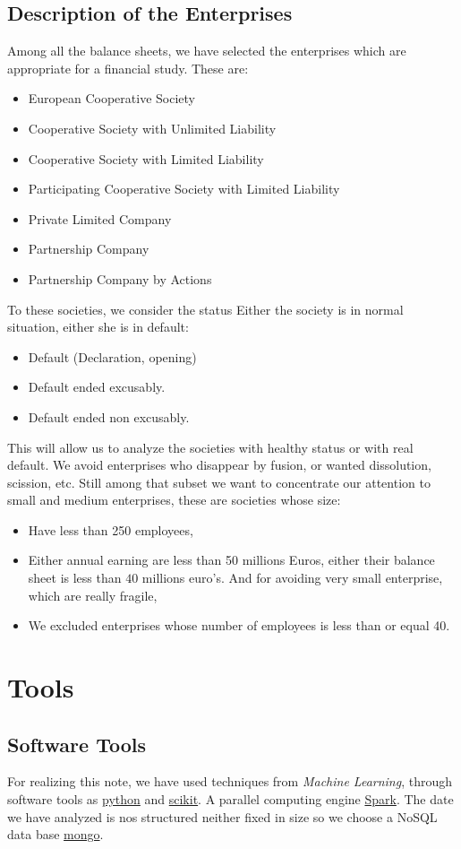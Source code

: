 \documentclass[DIV=calc, paper=a4, fontsize=11pt, twocolumn]{scrartcl}
\begin{document}
\subsection{Description of the Enterprises}
Among all the balance sheets, we have selected the enterprises which are appropriate for a financial study. These are:
\begin{itemize}
    \item European Cooperative Society
    \item Cooperative Society with Unlimited Liability
    \item Cooperative Society with Limited Liability
    \item Participating Cooperative Society with Limited Liability
    \item Private Limited Company
    \item Partnership Company
    \item Partnership Company by Actions
\end{itemize}
To these societies, we consider the status Either the society is in normal situation, either she is in default:
\begin{itemize}
    \item Default (Declaration, opening)
    \item Default ended excusably.
    \item Default ended non excusably.
\end{itemize}
This will allow us to analyze the societies with healthy status or with real default. We avoid enterprises who disappear by fusion, or
wanted dissolution, scission, etc.
Still among that subset we want to concentrate our attention to small and medium enterprises, these are societies whose size:
\begin{itemize}
    \item Have less than 250 employees,
    \item Either annual earning are less than 50 millions Euros, either their balance sheet is less than $40$ millions euro's. And for avoiding very small enterprise, which are really fragile,
    \item We excluded enterprises whose number of employees is less than or equal 40.
\end{itemize}

\section{Tools}
\subsection{Software Tools}
For realizing this note, we have used techniques from \emph{Machine Learning}, through software tools as \href{https://www.python.org/}{python}
and \href{http://scikit-learn.org/stable/}{scikit}.  A parallel computing engine \href{http://spark.apache.org/}{Spark}. The
date we have analyzed is nos structured neither fixed in size so we choose a NoSQL data base \href{https://www.mongodb.com/}{mongo}.
\end{document}
